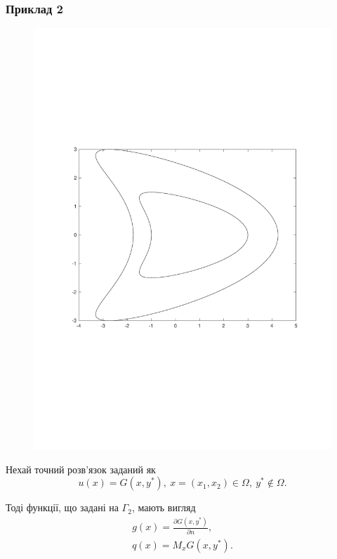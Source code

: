 \documentclass[10pt]{beamer}
\begin{document}
\begin{frame}
\frametitle{Приклад 2}

\begin{figure}[h!]
\centering
	\vspace*{-1.7cm}
	\includegraphics[scale=.2]{sample2.pdf}
	\vspace*{-1.9cm}
\end{figure}

Нехай точний розв'язок заданий як
$$u(x)=G(x,y^*), \ x=(x_1, x_2)\in\Omega, \ y^*\notin\Omega.$$

Тоді функції, що задані на $\Gamma_2$, мають вигляд
 \begin{gather*}
	g(x) = \frac{\partial G(x,y^*)}{\partial n},\\
	q(x) = M_xG(x,y^*).
 \end{gather*}

\end{frame}
\end{document}
